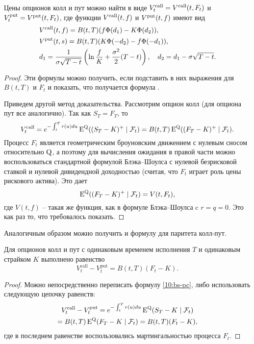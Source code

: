 \begin{theorem}
\label{10:t:black}
Цены опционов колл и пут можно найти в виде $V_t^\text{call} = V^{\text{\normalfont call}}(t,F_t)$ и $V_t^\text{put} = V^{\text{\normalfont put}}(t,F_t)$, где функции $V^{\text{\normalfont call}}(t,f)$ и $V^{\text{\normalfont put}}(t,f)$ имеют вид
\begin{equation}
\label{bs2:b-formula}
\begin{aligned}
&V^{\text{\normalfont call}}(t,f) = B(t,T) (f\Phi(d_1) - K\Phi(d_2)), \\
&V^{\text{\normalfont put}}(t,s) = B(t,T) (K\Phi(-d_2) - f\Phi(-d_1)),\\
&d_1 = \frac{1}{\sigma\sqrt{T-t}} \left(\ln\frac{f}{K} + \frac{\sigma^2}{2}(T-t)\right), \quad
d_2 = d_1 - \sigma\sqrt{T-t}.
\end{aligned}
\end{equation}
\end{theorem}

\begin{proof}
Эти формулы можно получить, если подставить в них выражения для $B(t,T)$ и $F_t$ и показать, что получается формула \bs.

Приведем другой метод доказательства.
Рассмотрим опцион колл (для опциона пут все аналогично). Так как $S_T = F_T$, то
\[
V_t^\text{call} = e^{-\int_t^T r(u) du} \operatorname{E}^{\mathrm{Q}} ((S_T-K)^+ \mid \mathcal{F}_t) 
= B(t,T) \operatorname{E}^{\mathrm{Q}}((F_T - K)^+ \mid \mathcal{F}_t). 
\]
Процесс $F_t$ является геометрическим броуновским движением с нулевым сносом относительно $\mathrm{Q}$, а поэтому для вычисления ожидания в правой части можно воспользоваться стандартной формулой Блэка--Шоулса с нулевой безрисковой ставкой и нулевой дивидендной доходностью (считая, что $F_t$ играет роль цены рискового актива).
Это дает
\[
\operatorname{E}^{\mathrm{Q}}((F_T - K)^+ \mid \mathcal{F}_t) = V(t,F_t),
\]
где $V(t,f)$ -- такая же функция, как в формуле Блэка--Шоулса c $r=q=0$.
Это как раз то, что требовалось показать.
\end{proof}

\noindent
Аналогичным образом можно получить и формулу для паритета колл-пут.

\begin{theorem}
Для опционов колл и пут с одинаковым временем исполнения $T$ и одинаковым страйком $K$ выполнено равенство
\[
V_t^\text{call} - V_t^\text{put} = B(t,T) (F_t - K).
\]
\end{theorem}

\begin{proof}
Можно непосредственно переписать формулу \eqref{10:bs-pc}, либо использовать следующую цепочку равенств:
\begin{multline*}
V_t^\text{call} - V_t^\text{put} = e^{-\int_t^T r(u) du} \operatorname{E}^{\mathrm{Q}} (S_T - K\mid \mathcal{F}_t) \\= 
B(t,T) \operatorname{E}^{\mathrm{Q}} (F_T - K\mid \mathcal{F}_t) = B(t,T) (F_t - K),
\end{multline*}
где в последнем равенстве воспользовались мартингальностью процесса $F_t$. 
\end{proof}

